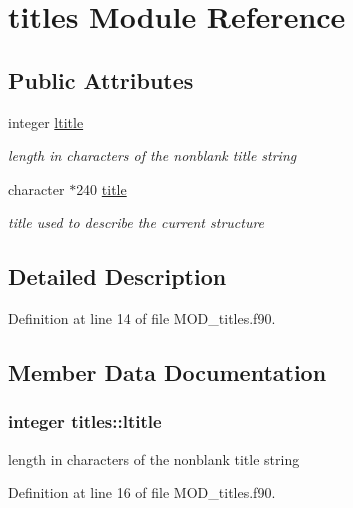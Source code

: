 \hypertarget{classtitles}{\section{titles Module Reference}
\label{classtitles}
}
\subsection*{Public Attributes}
\begin{DoxyCompactItemize}
\item 
integer \hyperlink{classtitles_ac613e31c3a80660e005b7479188e06a4}{ltitle}
\begin{DoxyCompactList}\small\item\em length in characters of the nonblank title string \end{DoxyCompactList}\item 
character $\ast$240 \hyperlink{classtitles_a76fe5ce9f23ba95b51adc3b9c65c194e}{title}
\begin{DoxyCompactList}\small\item\em title used to describe the current structure \end{DoxyCompactList}\end{DoxyCompactItemize}


\subsection{Detailed Description}


Definition at line 14 of file M\-O\-D\-\_\-titles.\-f90.



\subsection{Member Data Documentation}
\hypertarget{classtitles_ac613e31c3a80660e005b7479188e06a4}{
\subsubsection[{ltitle}]{\setlength{\rightskip}{0pt plus 5cm}integer titles\-::ltitle}}\label{classtitles_ac613e31c3a80660e005b7479188e06a4}


length in characters of the nonblank title string 



Definition at line 16 of file M\-O\-D\-\_\-titles.\-f90.

